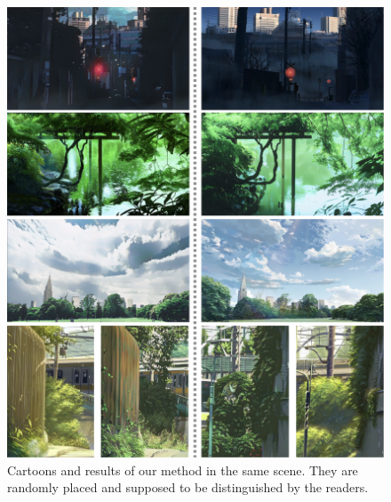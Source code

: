 \documentclass[10pt,twocolumn,letterpaper]{article}
\begin{document}
\begin{figure}[htb]
\centering
\includegraphics[width=\linewidth]{figures/compare.pdf}
\caption{Cartoons and results of our method in the same scene. They are randomly placed and supposed to be distinguished by the readers.}
\label{fig:compare1}
\end{figure}
\end{document}
